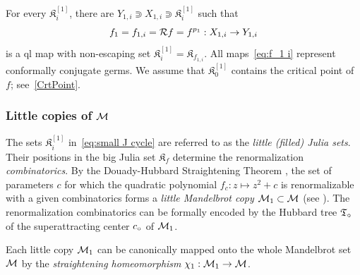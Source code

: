 \documentclass{amsart}
\newcommand{\filled}{{\mathfrak K }}
\newcommand{\Hub}{{\mathfrak T}}
\newcommand{\1}{{\mathbb 1 }}
\begin{document}
For every $\filled^{[1]}_i$, there are $Y_{1,i} \Supset X_{1,i}\Supset \filled^{[1]}_i$ such that 
\begin{equation}
\label{eq:f_1 i} f_1=f_{1,i}= {\mathcal R} f= f^{p_1}: X_{1,i} \rightarrow Y_{1,i}
\end{equation}
is a ql map with non-escaping set $\filled^{[1]}_i=\filled_{f_{1,i}}$. All maps~\eqref{eq:f_1 i} represent conformally conjugate germs. We assume that $\filled^{[1]}_0$ contains the critical point of $f$; see~\ref{CrtPoint}.

\subsubsection{Little copies of ${\mathcal M}$}\label{sss:LittleCopies} The sets $\filled^{[1]}_i$ in~\eqref{eq:small J cycle} are referred to as the {\it little (filled) Julia sets}.
Their positions in the big Julia set $\filled_f$ determine the renormalization {\it combinatorics}.
By the Douady-Hubbard Straightening Theorem \cite{DH:pol-like},
the set of parameters $c$ for which the quadratic polynomial $f_c\colon z\mapsto z^2+c$ is renormalizable
with a given combinatorics forms a {\it little Mandelbrot copy}  ${\mathcal M}_1\subset {\mathcal{M}}$
(see \cite[Theorem 43.1]{L:book}).
%
The renormalization combinatorics can be formally encoded by the  Hubbard tree $\Hub_\base$
of the superattracting center  $c_{\circ}$ of ${\mathcal M}_1$.

Each little copy ${\mathcal M}_1$ can be canonically mapped onto the whole
Mandelbrot set ${\mathcal M}$ by the {\em straightening homeomorphism}
$\chi_1: {\mathcal M}_1\rightarrow {\mathcal M}$. 


\end{document}
